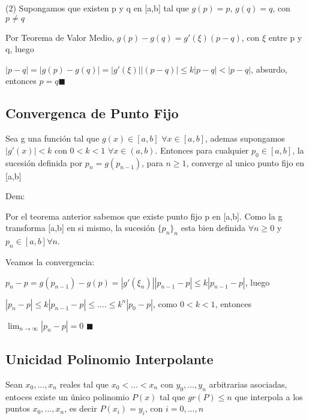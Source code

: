 \documentclass{article}
\begin{document}
\vspace{5mm}

(2) Supongamos que existen p y q en [a,b] tal que $g(p) = p$, $g(q) = q$, con $p\not=q$

Por Teorema de Valor Medio, $g(p)-g(q) = g'(\xi)(p-q)$, con $\xi$ entre p y q, luego

$|p-q| = |g(p)-g(q)| =|g'(\xi)||(p-q)| \leq k|p-q|<|p-q|$, absurdo, entonces $p=q$$\blacksquare$

\vspace{10mm}

\subsection{Convergenca de Punto Fijo}\label{Punto-f}

Sea g una función tal que $g(x) \in [a,b]$ $\forall x \in [a,b]$, ademas supongamos 
$|g'(x)| < k$ con $0 < k < 1$ $\forall x \in (a,b)$. Entonces para cualquier $p_0 \in [a,b]$,
la sucesión definida por $p_n = g(p_{n-1})$, para $n \geq 1$, converge al unico punto fijo en [a,b]

\vspace{5mm}

Dem:

Por el teorema anterior sabemos que existe punto fijo p en [a,b]. Como la g transforma [a,b] en si mismo,
la sucesión $\{ p_n \}_n$ esta bien definida $\forall n \geq 0$ y $p_n \in [a,b] \forall n$.

Veamos la convergencia:

$p_n-p= g(p_{n-1})-g(p) = |g'(\xi_n)||p_{n-1}-p| \leq k|p_{n-1}-p|$, luego

$|p_n-p| \leq k|p_{n-1}-p| \leq .... \leq k^n|p_0-p|$, como $ 0 < k < 1$, entonces

$\lim_{n \to \infty} |p_n-p| = 0$ $\blacksquare$

\vspace{10mm}


\subsection{Unicidad Polinomio Interpolante}\label{Unicidad-Polinomio-Interpolante}

Sean $ x_0,...,x_n $ reales tal que $x_0<...<x_n$ con $y_0,...,y_n$ arbitrarias asociadas, entoces
existe un único polinomio $P(x)$ tal que $gr(P) \leq n $ que interpola a los puntos $x_0,...,x_n$, es decir
$P(x_i) = y_i$, con $ i = 0,...,n$

\vspace{5mm}
\end{document}

